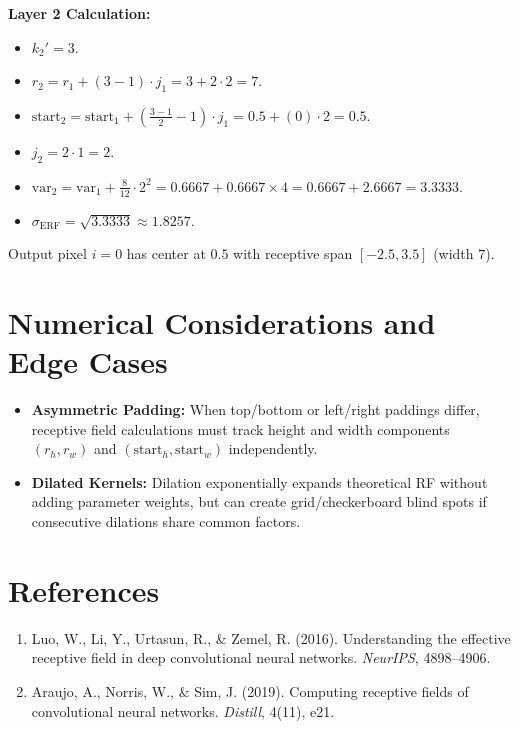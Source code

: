 \documentclass[11pt,a4paper]{article}
\theoremstyle{definition}
\begin{document}
\textbf{Layer 2 Calculation:}
\begin{itemize}
    \item $k_2' = 3$.
    \item $r_2 = r_1 + (3 - 1) \cdot j_1 = 3 + 2 \cdot 2 = 7$.
    \item $\text{start}_2 = \text{start}_1 + \left( \frac{3-1}{2} - 1 \right) \cdot j_1 = 0.5 + (0) \cdot 2 = 0.5$.
    \item $j_2 = 2 \cdot 1 = 2$.
    \item $\text{var}_2 = \text{var}_1 + \frac{8}{12} \cdot 2^2 = 0.6667 + 0.6667 \times 4 = 0.6667 + 2.6667 = 3.3333$.
    \item $\sigma_{\text{ERF}} = \sqrt{3.3333} \approx 1.8257$.
\end{itemize}

Output pixel $i=0$ has center at $0.5$ with receptive span $[-2.5, 3.5]$ (width $7$).

\section{Numerical Considerations and Edge Cases}

\begin{itemize}
    \item \textbf{Asymmetric Padding:} When top/bottom or left/right paddings differ, receptive field calculations must track height and width components $(r_h, r_w)$ and $(\text{start}_h, \text{start}_w)$ independently.
    \item \textbf{Dilated Kernels:} Dilation exponentially expands theoretical RF without adding parameter weights, but can create grid/checkerboard blind spots if consecutive dilations share common factors.
\end{itemize}

\section{References}
\begin{enumerate}
    \item Luo, W., Li, Y., Urtasun, R., & Zemel, R. (2016). Understanding the effective receptive field in deep convolutional neural networks. \emph{NeurIPS}, 4898--4906.
    \item Araujo, A., Norris, W., & Sim, J. (2019). Computing receptive fields of convolutional neural networks. \emph{Distill}, 4(11), e21.
\end{enumerate}
\end{document}
